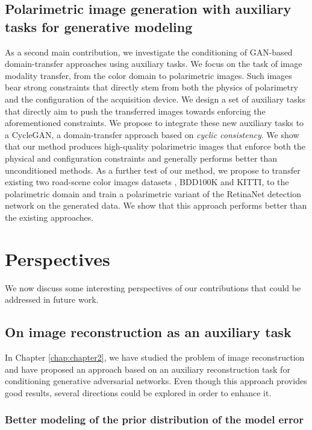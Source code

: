 \subsection*{Polarimetric image generation with auxiliary tasks for generative modeling}

As a second main contribution, we investigate the conditioning of \ac{GAN}-based domain-transfer approaches using auxiliary tasks. We focus on the task of image modality transfer, from the color domain to polarimetric images. Such images bear strong constraints that directly stem from both the physics of polarimetry and the configuration of the acquisition device. We design a set of auxiliary tasks that directly aim to push the transferred images towards enforcing the aforementioned constraints. We propose to integrate these new auxiliary tasks to a CycleGAN, a domain-transfer approach based on \textit{cyclic consistency}. We show that our method produces high-quality polarimetric images that enforce both the physical and configuration constraints and generally performs better than unconditioned methods. As a further test of our method, we propose to transfer existing two road-scene color images datasets , BDD100K and KITTI, to the polarimetric domain and train a polarimetric variant of the RetinaNet detection network on the generated data. We show that this approach performs better than the existing approaches.

\section*{Perspectives}

We now discuss some interesting perspectives of our contributions that could be addressed in future work.

\subsection*{On image reconstruction as an auxiliary task}

In Chapter \ref{chap:chapter2}, we have studied the problem of image reconstruction and have proposed an approach based on an auxiliary reconstruction task for conditioning generative adversarial networks. Even though this approach provides good results, several directions could be explored in order to enhance it.

\subsubsection*{Better modeling of the prior distribution of the model error}

